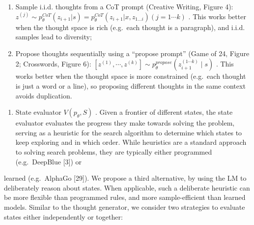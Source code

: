 \documentclass[
]{article}
\providecommand{\tightlist}{%
  \setlength{\itemsep}{0pt}\setlength{\parskip}{0pt}}
\begin{document}
\begin{enumerate}
\def\labelenumi{(\alph{enumi})}
\tightlist
\item
  Sample i.i.d. thoughts from a CoT prompt (Creative Writing, Figure 4):
  \(z^{(j)} \sim p_{\theta}^{CoT}(z_{i+1}|s) = p_{\theta}^{CoT}(z_{i+1}|x, z_{1\dots i}) (j = 1 \cdots k)\)
  . This works better when the thought space is rich (e.g.~each thought
  is a paragraph), and i.i.d. samples lead to diversity;\\
\item
  Propose thoughts sequentially using a ``propose prompt'' (Game of 24,
  Figure 2; Crosswords, Figure 6):
  \([z^{(1)},\cdots,z^{(k)}]\sim p_{\theta}^{propose}(z_{i+1}^{(1\cdots k)}\mid s)\)
  . This works better when the thought space is more constrained
  (e.g.~each thought is just a word or a line), so proposing different
  thoughts in the same context avoids duplication.
\end{enumerate}

\begin{enumerate}
\def\labelenumi{\arabic{enumi}.}
\setcounter{enumi}{2}
\tightlist
\item
  State evaluator \(V(p_{\theta}, S)\) . Given a frontier of different
  states, the state evaluator evaluates the progress they make towards
  solving the problem, serving as a heuristic for the search algorithm
  to determine which states to keep exploring and in which order. While
  heuristics are a standard approach to solving search problems, they
  are typically either programmed (e.g.~DeepBlue {[}3{]}) or
\end{enumerate}

learned (e.g.~AlphaGo {[}29{]}). We propose a third alternative, by
using the LM to deliberately reason about states. When applicable, such
a deliberate heuristic can be more flexible than programmed rules, and
more sample-efficient than learned models. Similar to the thought
generator, we consider two strategies to evaluate states either
independently or together:
\end{document}
